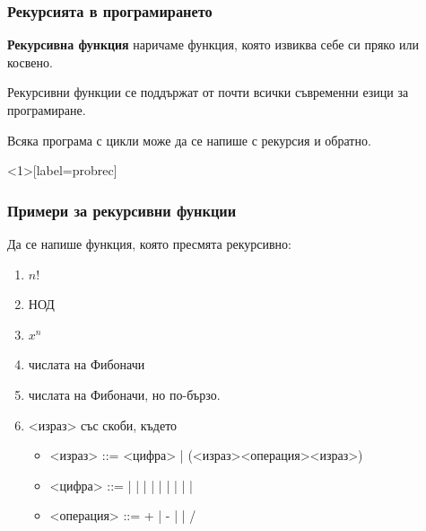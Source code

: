 \documentclass{beamer}
\begin{document}
\begin{frame}
  \frametitle{Рекурсията в програмирането}

  \begin{definition}
    \textbf{Рекурсивна функция} наричаме функция, която извиква себе си пряко или косвено.
  \end{definition}
  \pause
  \vspace{2em}
  Рекурсивни функции се поддържат от почти всички съвременни езици за програмиране.\\[2em]
  \pause
  \begin{theorem}
    Всяка програма с цикли може да се напише с рекурсия и обратно.
  \end{theorem}
\end{frame}

\begin{frame}<1>[label=probrec]
  \frametitle{Примери за рекурсивни функции}

  Да се напише функция, която пресмята рекурсивно:
  \begin{enumerate}[<+->]
  \item $n!$
  \item НОД
  \item $x^n$
  \item числата на Фибоначи
  \item числата на Фибоначи, но \alert{по-бързо}.
  \item{} <израз> със скоби, където
    \begin{itemize}[<.->]
    \item{} <израз> ::= <цифра> | \tta(<израз><операция><израз>\tta)
    \item{} <цифра> ::=  |  |  |  |  |  |  |  |  | 
    \item{} <операция> ::= \tta+ | \tta- | \tta* | \tta/
    \end{itemize}
  \end{enumerate}
\end{frame}
\end{document}
